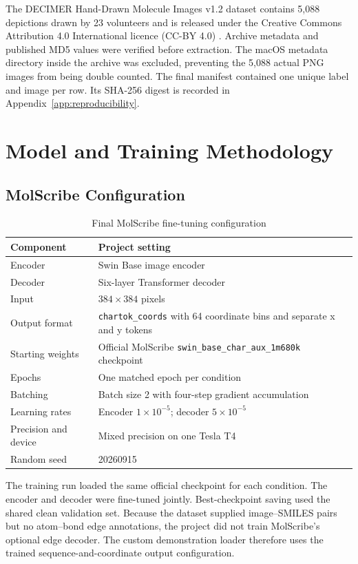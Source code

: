 \documentclass[11pt,a4paper]{article}
\begin{document}
The DECIMER Hand-Drawn Molecule Images v1.2 dataset contains 5,088 depictions drawn by 23
volunteers and is released under the Creative Commons Attribution 4.0 International licence
(CC-BY 4.0) \cite{decimerdata}. Archive metadata and published MD5 values were verified before
extraction. The macOS metadata directory inside the archive was excluded, preventing the 5,088
actual PNG images from being double counted. The final manifest contained one unique label and
image per row. Its SHA-256 digest is recorded in Appendix~\ref{app:reproducibility}.

\section*{Model and Training Methodology}

\subsection*{MolScribe Configuration}

\begin{table}[H]
\centering
\caption{Final MolScribe fine-tuning configuration}
\begin{tabularx}{\textwidth}{L{4cm}Y}
\toprule
\textbf{Component} & \textbf{Project setting} \\
\midrule
Encoder & Swin Base image encoder \\
Decoder & Six-layer Transformer decoder \\
Input & $384\times384$ pixels \\
Output format & \texttt{chartok\_coords} with 64 coordinate bins and separate x and y tokens \\
Starting weights & Official MolScribe \texttt{swin\_base\_char\_aux\_1m680k} checkpoint \\
Epochs & One matched epoch per condition \\
Batching & Batch size 2 with four-step gradient accumulation \\
Learning rates & Encoder $1\times10^{-5}$; decoder $5\times10^{-5}$ \\
Precision and device & Mixed precision on one Tesla T4 \\
Random seed & 20260915 \\
\bottomrule
\end{tabularx}
\end{table}

The training run loaded the same official checkpoint for each condition. The encoder and
decoder were fine-tuned jointly. Best-checkpoint saving used the shared clean validation set.
Because the dataset supplied image--SMILES pairs but no atom--bond edge annotations, the
project did not train MolScribe's optional edge decoder. The custom demonstration loader
therefore uses the trained sequence-and-coordinate output configuration.
\end{document}
